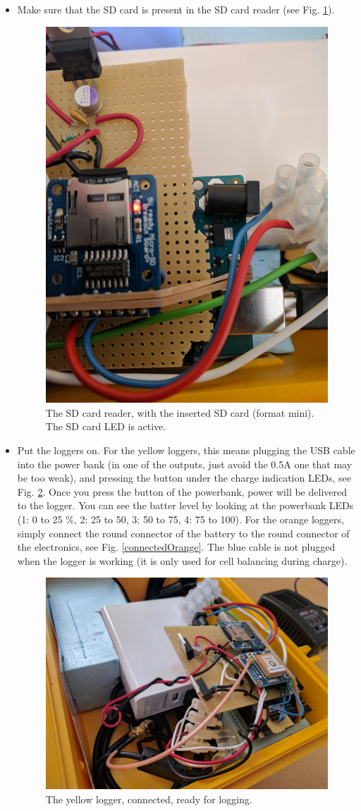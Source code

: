 \documentclass[pdftex,a4paper,12pt,twocolumn,fleqn,captions=tableheading]{scrartcl}
\begin{document}
\begin{itemize}
  \item Make sure that the SD card is present in the SD card reader (see Fig. \ref{SDwithCard}).

  \begin{figure}
  \begin{center}
  \includegraphics[width=.4\textwidth]{Figures/IMG_20170418_134552}
  \caption{\label{SDwithCard} The SD card reader, with the inserted SD card (format mini). The SD card LED is active.}
  \end{center}
  \end{figure}

  \item Put the loggers on. For the yellow loggers, this means plugging the USB cable into the power bank (in one of the outputs, just avoid the 0.5A one that may be too weak), and pressing the button under the charge indication LEDs, see Fig. \ref{connectedYellow}. Once you press the button of the powerbank, power will be delivered to the logger. You can see the batter level by looking at the powerbank LEDs (1: 0 to 25 \%, 2: 25 to 50, 3: 50 to 75, 4: 75 to 100). For the orange loggers, simply connect the round connector of the battery to the round connector of the electronics, see Fig. \ref{connectedOrange}. The blue cable is not plugged when the logger is working (it is only used for cell balancing during charge).

  \begin{figure}
  \begin{center}
  \includegraphics[width=.8\textwidth]{Figures/IMG_20170418_102010}
  \caption{\label{connectedYellow} The yellow logger, connected, ready for logging.}
  \end{center}
  \end{figure}


\end{itemize}
\end{document}
